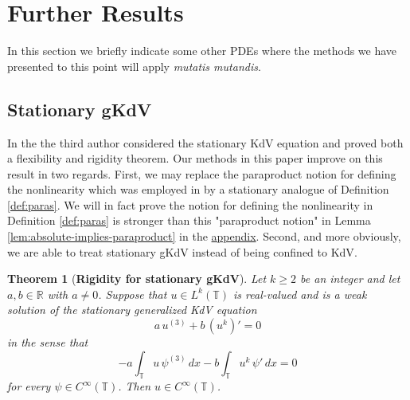 \documentclass[12pt,reqno,letterpaper]{amsart}
\numberwithin{equation}{section}
\newcommand{\1}{{\bf 1}}
\newcommand{\2}{{\bf 2}}
\newcommand{\T}{\mathbb T}
\newtheorem{theorem}{Theorem}[section]
\theoremstyle{remark}
\theoremstyle{remark}
\begin{document}
\section{Further Results}\label{sec:6}

In this section we briefly indicate some other PDEs where the methods we have presented to this point will apply \textit{mutatis mutandis}.

\subsection{Stationary \textsf{gKdV}}

In \cite{Pathak} the the third author considered the stationary \textsf{KdV} equation and proved both a flexibility and rigidity theorem. Our methods in this paper improve on this result in two regards. First, we may replace the paraproduct notion for defining the nonlinearity which was employed in \cite{Pathak} by a stationary analogue of Definition \ref{def:paras}. We will in fact prove the notion for defining the nonlinearity in Definition \ref{def:paras} is stronger than this "paraproduct notion" in Lemma \ref{lem:absolute-implies-paraproduct} in the \hyperref[sec:appendix]{appendix}. Second, and more obviously, we are able to treat stationary \textsf{gKdV} instead of being confined to \textsf{KdV}.

\begin{theorem}[\textbf{Rigidity for stationary \textsf{gKdV}}]\label{thm:stat-gkdv-rig}
Let $k\geq 2$ be an integer and let $a,b\in\mathbb R$ with $a\neq0$.
Suppose that $u\in L^k(\T)$ is real-valued and is a weak solution of the
stationary generalized \textsf{KdV} equation
\[
a\,u^{(3)}+b\,(u^k)'=0
\]
in the sense that
\begin{equation*}
    -a\int_\T u\,\psi^{(3)}\,dx
    -
    b\int_\T u^k\,\psi'\,dx
    =
    0
\end{equation*}
for every $\psi\in C^\infty(\T)$. Then $u\in C^\infty(\T)$.
\end{theorem}
\end{document}

